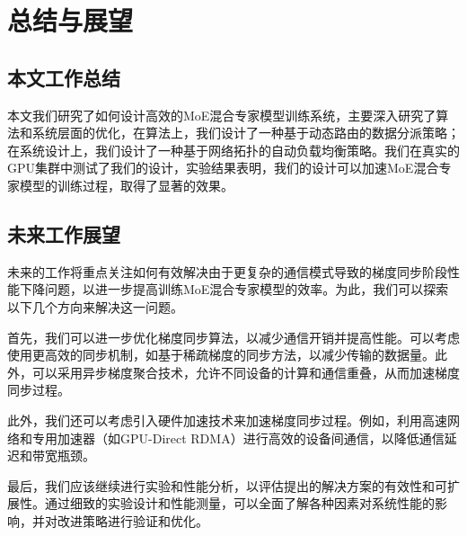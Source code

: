 \chapter{总结与展望}

\section{本文工作总结}

本文我们研究了如何设计高效的MoE混合专家模型训练系统，主要深入研究了算法和系统层面的优化，在算法上，我们设计了一种基于动态路由的数据分派策略；在系统设计上，我们设计了一种基于网络拓扑的自动负载均衡策略。我们在真实的GPU集群中测试了我们的设计，实验结果表明，我们的设计可以加速MoE混合专家模型的训练过程，取得了显著的效果。

\section{未来工作展望}

未来的工作将重点关注如何有效解决由于更复杂的通信模式导致的梯度同步阶段性能下降问题，以进一步提高训练MoE混合专家模型的效率。为此，我们可以探索以下几个方向来解决这一问题。

首先，我们可以进一步优化梯度同步算法，以减少通信开销并提高性能。可以考虑使用更高效的同步机制，如基于稀疏梯度的同步方法，以减少传输的数据量。此外，可以采用异步梯度聚合技术，允许不同设备的计算和通信重叠，从而加速梯度同步过程。

此外，我们还可以考虑引入硬件加速技术来加速梯度同步过程。例如，利用高速网络和专用加速器（如GPU-Direct RDMA）进行高效的设备间通信，以降低通信延迟和带宽瓶颈。

最后，我们应该继续进行实验和性能分析，以评估提出的解决方案的有效性和可扩展性。通过细致的实验设计和性能测量，可以全面了解各种因素对系统性能的影响，并对改进策略进行验证和优化。

\endinput